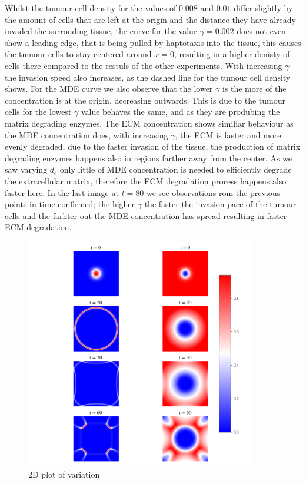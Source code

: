 Whilst the tumour cell density for the values of $0.008$ and $0.01$ differ slightly by the amount of cells that are left at the origin and the distance they have already invaded the surrouding tissue, the curve for the value $\gamma=0.002$ does not even show a leading edge, that is being pulled by haptotaxis into the tissue, this causes the tumour cells to stay centered around $x=0$, resulting in a higher denisty of cells there compared to the restuls of the other experiments. With increasing $\gamma$ the invasion speed also increases, as the dashed line for the tumour cell density shows. 
For the MDE curve we also observe that the lower $\gamma$ is the more of the concentration is at the origin, decreasing outwards. This is due to the tumour cells for the lowest $\gamma$ value behaves the same, and as they are produbing the matrix degrading enzymes. The ECM concentration shows similiar behaviour as the MDE concentration does, with increasing $\gamma$, the ECM is faster and more evenly degraded, due to the faster invasion of the tissue, the production of matrix degrading enzymes happens also in regions farther away from the center. As we saw varying $d_c$ only little of MDE concentration is needed to efficiently degrade the extracellular matrix, therefore the ECM degradation process happens also faster here.\newline
In the last image at $t=80$ we see observations rom the previous points in time confirmed; the higher $\gamma$ the faster the invasion pace of the tumour cells and the farhter out the MDE concentration has spread resulting in faster ECM degradation.\newline 
\begin{figure}[h]
    \centering
    \includegraphics[width=0.9\textwidth]{resources/images/2D_plot.png}
    \caption{2D plot of variation}
    \label{fig:gamma_2D_plot}
\end{figure}
